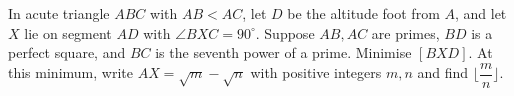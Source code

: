 In acute triangle $ABC$ with $AB<AC$, let $D$ be the altitude foot from $A$, and let $X$ lie on segment $AD$ with $\angle BXC=90^\circ$. Suppose $AB,AC$ are primes, $BD$ is a perfect square, and $BC$ is the seventh power of a prime. Minimise $[BXD]$. At this minimum, write $AX=\sqrt m-\sqrt n$ with positive integers $m,n$ and find $\lfloor \dfrac{m}{n} \rfloor$.
